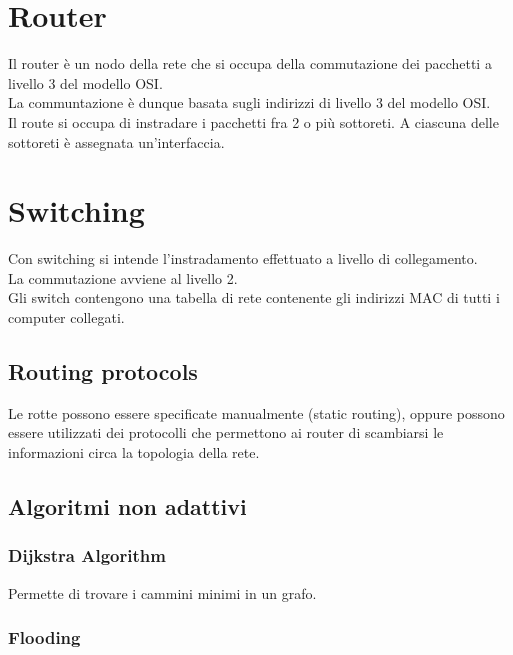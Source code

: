\documentclass[a4paper]{article}
\author{Paolo Bettelini}
\date{}
\begin{document}
\maketitle
\tableofcontents
\pagebreak

\section{Router}

Il router è un nodo della rete che si occupa della commutazione dei pacchetti
a livello 3 del modello OSI.
\\
La communtazione è dunque basata sugli indirizzi
di livello 3 del modello OSI.
\\
Il route si occupa di instradare i pacchetti fra 2 o più sottoreti.
A ciascuna delle sottoreti è assegnata un'interfaccia.

\section{Switching}

Con switching si intende l'instradamento effettuato
a livello di collegamento.
\\
La commutazione
avviene al livello 2.
\\
Gli switch contengono una tabella di rete
contenente gli indirizzi MAC di tutti i computer
collegati.


\subsection{Routing protocols}
Le rotte possono essere specificate manualmente
(static routing), oppure possono essere utilizzati
dei protocolli che permettono ai router di scambiarsi
le informazioni circa la topologia della rete.

\subsection{Algoritmi non adattivi}

\subsubsection{Dijkstra Algorithm}

Permette di trovare i cammini minimi in un grafo.

\subsubsection{Flooding}
\end{document}
